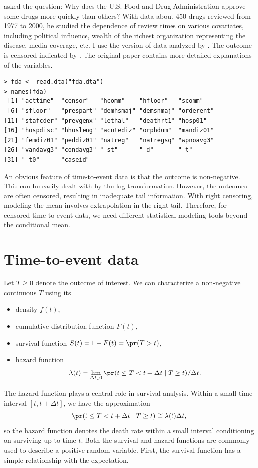 \citet{carpenter2002groups} asked the question: Why does the U.S. Food and Drug Administration approve some drugs more quickly than others? With data about 450 drugs reviewed from 1977 to 2000, he studied the dependence of review times on various covariates, including political influence, wealth of the richest organization representing the disease, media coverage, etc. I use the version of data analyzed by
\citet{keele2010proportionally}. 
The outcome  is censored indicated by .
The original paper contains more detailed explanations of the variables. 


\begin{lstlisting}
> fda <- read.dta("fda.dta")
> names(fda)
 [1] "acttime"  "censor"   "hcomm"    "hfloor"   "scomm"   
 [6] "sfloor"   "prespart" "demhsmaj" "demsnmaj" "orderent"
[11] "stafcder" "prevgenx" "lethal"   "deathrt1" "hosp01"  
[16] "hospdisc" "hhosleng" "acutediz" "orphdum"  "mandiz01"
[21] "femdiz01" "peddiz01" "natreg"   "natregsq" "wpnoavg3"
[26] "vandavg3" "condavg3" "_st"      "_d"       "_t"      
[31] "_t0"      "caseid"  
\end{lstlisting}


An obvious feature of time-to-event data is that the outcome is non-negative. This can be easily dealt with by the log transformation. However, the outcomes are often censored, resulting in inadequate tail information. With right censoring, modeling the mean involves extrapolation in the right tail.  Therefore,  for censored time-to-event data, we need different statistical modeling tools beyond the conditional mean. 




\section{Time-to-event data}


Let $T\geq0$ denote the outcome of interest. We can characterize
a non-negative continuous $T$ using its 
\begin{itemize}
\item
density $f(t)$, 
\item
cumulative distribution function $F(t)$, 
\item
survival function $S(t)=1-F(t)=\pr(T>t)$,   
\item
hazard function
\[
\lambda(t)=\lim_{\Delta t\downarrow0}\pr(t\leq T<t+\Delta t\mid T\geq t)/\Delta t.
\]
\end{itemize}
The hazard function plays a central role in survival analysis.  Within a small time interval $[t,t+\Delta t]$, we have the approximation
\[
\pr(t\leq T<t+\Delta t\mid T\geq t)\cong\lambda(t)\Delta t,
\]
so the hazard function denotes the death rate within a small interval conditioning on surviving up to time $t$.
Both the survival and hazard functions are commonly used to describe a positive random
variable. 
First, the survival function has a simple relationship with the expectation.

